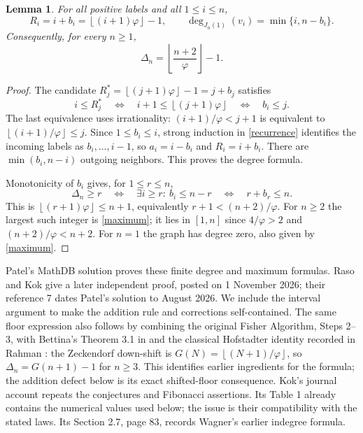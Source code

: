 \documentclass[11pt]{article}
\newtheorem{lemma}[theorem]{Lemma}
\newcommand{\fl}[1]{\left\lfloor #1\right\rfloor}
\newcommand{\ph}{\varphi}
\begin{document}
\begin{lemma}\label{formula}
For all positive labels and all $1\le i\le n$,
\begin{equation}\label{degree}
 R_i=i+b_i=\fl{(i+1)\ph}-1,\qquad
 \deg_{J_n(1)}(v_i)=\min\{i,n-b_i\}.
\end{equation}
Consequently, for every $n\ge1$,
\begin{equation}\label{maximum}
 \Delta_n=\fl{\frac{n+2}{\ph}}-1.
\end{equation}
\end{lemma}
\begin{proof}
The candidate $R_j^*=\fl{(j+1)\ph}-1=j+b_j$ satisfies
\[
 i\le R_j^*\quad\Longleftrightarrow\quad
 i+1\le\fl{(j+1)\ph}\quad\Longleftrightarrow\quad b_i\le j.
\]
The last equivalence uses irrationality: $(i+1)/\ph<j+1$ is equivalent
to $\fl{(i+1)/\ph}\le j$. Since $1\le b_i\le i$, strong induction in
\eqref{recurrence} identifies the incoming labels as $b_i,\ldots,i-1$,
so $a_i=i-b_i$ and $R_i=i+b_i$. There are $\min(b_i,n-i)$ outgoing
neighbors. This proves the degree formula.

Monotonicity of $b_i$ gives, for $1\le r\le n$,
\[
 \Delta_n\ge r\quad\Longleftrightarrow\quad
 \exists i\ge r:\ b_i\le n-r
 \quad\Longleftrightarrow\quad r+b_r\le n.
\]
This is $\fl{(r+1)\ph}\le n+1$, equivalently $r+1<(n+2)/\ph$.
For $n\ge2$ the largest such integer is \eqref{maximum}; it lies in
$[1,n]$ since $4/\ph>2$ and $(n+2)/\ph<n+2$. For $n=1$ the graph
has degree zero, also given by \eqref{maximum}.
\end{proof}

Patel's MathDB solution \cite{patel} proves these finite degree and
maximum formulas. Raso and Kok \cite[Theorems 4.5 and 4.8]{raso}
give a later independent proof, posted on 1 November 2026; their
reference 7 dates Patel's solution to August 2026. We include the interval
argument to make the addition rule and corrections self-contained.
The same floor expression also follows by combining the original
Fisher Algorithm, Steps 2--3, with Bettina's Theorem 3.1 in
\cite{original} and the classical Hofstadter identity recorded in
Rahman \cite[Section 1, p.~1]{rahman}: the Zeckendorf down-shift is
$G(N)=\fl{(N+1)/\ph}$, so $\Delta_n=G(n+1)-1$ for $n\ge3$.
This identifies earlier ingredients for the formula; the addition
defect below is its exact shifted-floor consequence.
Kok's journal account \cite[Conjectures 2.4.1--2.4.2 and
Proposition 2.21, pp.~72--74]{critical} repeats the conjectures and
Fibonacci assertions. Its Table 1 already contains the numerical values
used below; the issue is their compatibility with the stated laws.
Its Section 2.7, page 83, records Wagner's earlier indegree formula.
\end{document}
